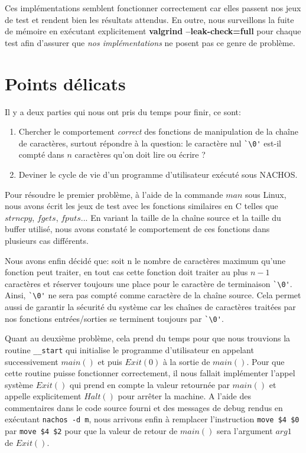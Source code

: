 \documentclass[12pt,a4paper]{article}
\begin{document}
Ces implémentations semblent fonctionner correctement car elles passent nos jeux de test et rendent bien les résultats attendus. En outre, nous surveillons la fuite de mémoire en exécutant explicitement \textbf{valgrind --leak-check=full} pour chaque test afin d'assurer que \textit{nos implémentations} ne posent pas ce genre de problème.

\section{Points délicats}
Il y a deux parties qui nous ont pris du temps pour finir, ce sont:
\begin{enumerate}
\item Chercher le comportement \textit{correct} des fonctions de manipulation de la chaîne de caractères, surtout répondre à la question: le caractère nul \verb$`\0'$ est-il compté dans $n$ caractères qu'on doit lire ou écrire ?
\item Deviner le cycle de vie d'un programme d'utilisateur exécuté sous NACHOS.
\end{enumerate}

Pour résoudre le premier problème, à l'aide de la commande $man$ sous Linux, nous avons écrit les jeux de test avec les fonctions similaires en C telles que $strncpy$, $fgets$, $fputs$... En variant la taille de la chaîne source et la taille du buffer utilisé, nous avons constaté le comportement de ces fonctions dans plusieurs cas différents.

Nous avons enfin décidé que: soit n le nombre de caractères maximum qu'une fonction peut traiter, en tout cas cette fonction doit traiter au plus $n-1$ caractères et réserver toujours une place pour le caractère de terminaison \verb$`\0'$. Ainsi, \verb$`\0'$ ne sera pas compté comme caractère de la chaîne source. Cela permet aussi de garantir la sécurité du système car les chaînes de caractères traitées par nos fonctions entrées/sorties se terminent toujours par \verb$`\0'$.

Quant au deuxième problème, cela prend du temps pour que nous trouvions la routine \verb$__start$ qui initialise le programme d'utilisateur en appelant successivement $main()$ et puis $Exit(0)$ à la sortie de $main()$. Pour que cette routine puisse fonctionner correctement, il nous fallait implémenter l'appel système $Exit()$ qui prend en compte la valeur retournée par $main()$ et appelle explicitement $Halt()$ pour arrêter la machine. A l'aide des commentaires dans le code source fourni et des messages de debug rendus en exécutant \texttt{nachos -d m}, nous arrivons enfin à remplacer l'instruction \texttt{move \$4 \$0} par \texttt{move \$4 \$2} pour que la valeur de retour de $main()$ sera l'argument $arg1$ de $Exit()$.
\end{document}

